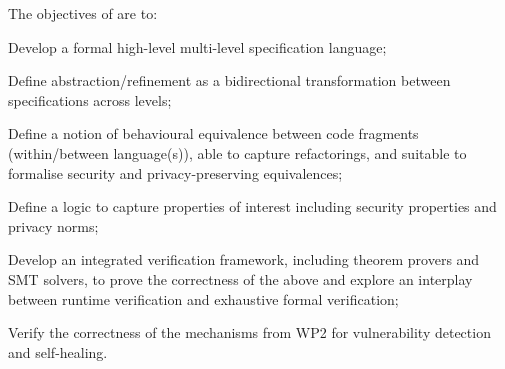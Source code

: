 \addtocounter{wpno}{1}
\begin{Workpackage}{\thewpno}
\WPTitle{\wpname{\thewpno}}


\begin{WPObjectives}
The objectives of \theWP{} are to:
\begin{compactitem}
\item Develop a formal high-level multi-level specification language; %
\item Define abstraction/refinement as a bidirectional transformation between specifications across levels;
\item Define a notion of behavioural equivalence between code fragments (within/between language(s)), able to capture refactorings, and suitable to formalise security and privacy-preserving equivalences;
\item Define a logic to capture properties of interest  %
including security properties and privacy norms;
\item Develop an integrated verification framework, including theorem provers and SMT solvers, to prove the correctness of the above and 
 explore an interplay between runtime verification and exhaustive formal verification;
 \item  Verify the correctness of the mechanisms from WP2 for vulnerability detection and self-healing.

\end{compactitem}

\end{WPObjectives}


\end{Workpackage}
